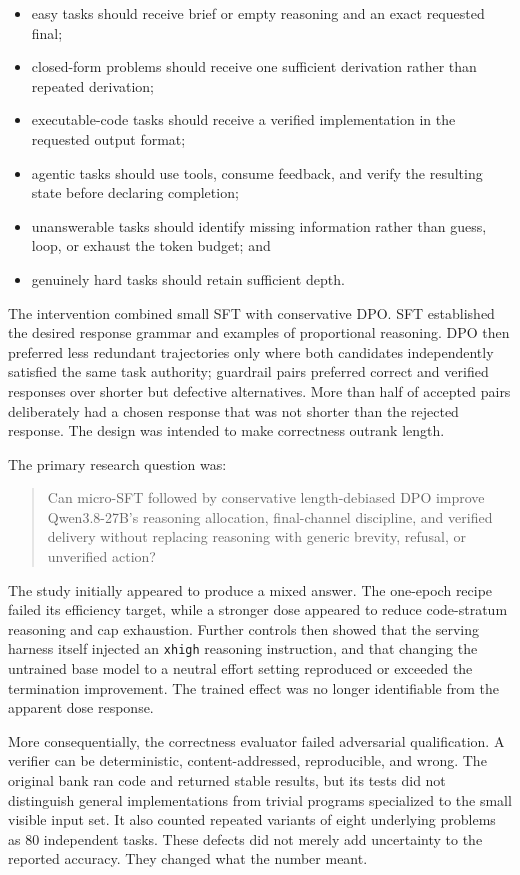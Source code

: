 \documentclass[
  9pt,
  letterpaper,
]{article}
\providecommand{\tightlist}{%
  \setlength{\itemsep}{0pt}\setlength{\parskip}{0pt}}
\begin{document}
\begin{itemize}
\tightlist
\item
  easy tasks should receive brief or empty reasoning and an exact
  requested final;
\item
  closed-form problems should receive one sufficient derivation rather
  than repeated derivation;
\item
  executable-code tasks should receive a verified implementation in the
  requested output format;
\item
  agentic tasks should use tools, consume feedback, and verify the
  resulting state before declaring completion;
\item
  unanswerable tasks should identify missing information rather than
  guess, loop, or exhaust the token budget; and
\item
  genuinely hard tasks should retain sufficient depth.
\end{itemize}

The intervention combined small SFT with conservative DPO. SFT
established the desired response grammar and examples of proportional
reasoning. DPO then preferred less redundant trajectories only where
both candidates independently satisfied the same task authority;
guardrail pairs preferred correct and verified responses over shorter
but defective alternatives. More than half of accepted pairs
deliberately had a chosen response that was not shorter than the
rejected response. The design was intended to make correctness outrank
length.

The primary research question was:

\begin{quote}
Can micro-SFT followed by conservative length-debiased DPO improve
Qwen3.8-27B's reasoning allocation, final-channel discipline, and
verified delivery without replacing reasoning with generic brevity,
refusal, or unverified action?
\end{quote}

The study initially appeared to produce a mixed answer. The one-epoch
recipe failed its efficiency target, while a stronger dose appeared to
reduce code-stratum reasoning and cap exhaustion. Further controls then
showed that the serving harness itself injected an \texttt{xhigh}
reasoning instruction, and that changing the untrained base model to a
neutral effort setting reproduced or exceeded the termination
improvement. The trained effect was no longer identifiable from the
apparent dose response.

More consequentially, the correctness evaluator failed adversarial
qualification. A verifier can be deterministic, content-addressed,
reproducible, and wrong. The original bank ran code and returned stable
results, but its tests did not distinguish general implementations from
trivial programs specialized to the small visible input set. It also
counted repeated variants of eight underlying problems as 80 independent
tasks. These defects did not merely add uncertainty to the reported
accuracy. They changed what the number meant.
\end{document}
